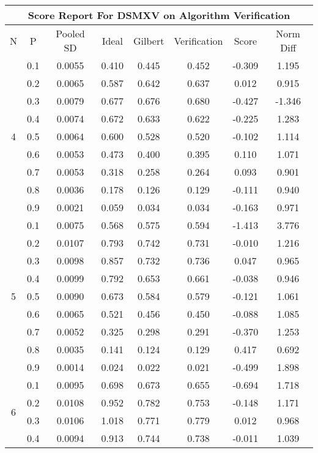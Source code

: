 \documentclass[11pt,a4paper]{report}
\begin{document}
\begin{longtable}{ | c | c || c | c | c | c | c | c | }
\hline
\multicolumn{8}{|c|}{ Score Report For DSMXV on Algorithm Verification} \\
\hline
N & P & Pooled SD &  Ideal &  Gilbert & Verification  & Score & Norm Diff \\
 \hline
 \hline
 \endhead
\multirow{9}{*}{4} & 0.1 & 0.0055 & 0.410 & 0.445 & 0.452 & -0.309 & 1.195 \\
 & 0.2 & 0.0065 & 0.587 & 0.642 & 0.637 & 0.012 & 0.915 \\
 & 0.3 & 0.0079 & 0.677 & 0.676 & 0.680 & -0.427 & -1.346 \\
 & 0.4 & 0.0074 & 0.672 & 0.633 & 0.622 & -0.225 & 1.283 \\
 & 0.5 & 0.0064 & 0.600 & 0.528 & 0.520 & -0.102 & 1.114 \\
 & 0.6 & 0.0053 & 0.473 & 0.400 & 0.395 & 0.110 & 1.071 \\
 & 0.7 & 0.0053 & 0.318 & 0.258 & 0.264 & 0.093 & 0.901 \\
 & 0.8 & 0.0036 & 0.178 & 0.126 & 0.129 & -0.111 & 0.940 \\
 & 0.9 & 0.0021 & 0.059 & 0.034 & 0.034 & -0.163 & 0.971 \\
 \hline
\multirow{9}{*}{5} & 0.1 & 0.0075 & 0.568 & 0.575 & 0.594 & -1.413 & 3.776 \\
 & 0.2 & 0.0107 & 0.793 & 0.742 & 0.731 & -0.010 & 1.216 \\
 & 0.3 & 0.0098 & 0.857 & 0.732 & 0.736 & 0.047 & 0.965 \\
 & 0.4 & 0.0099 & 0.792 & 0.653 & 0.661 & -0.038 & 0.946 \\
 & 0.5 & 0.0090 & 0.673 & 0.584 & 0.579 & -0.121 & 1.061 \\
 & 0.6 & 0.0065 & 0.521 & 0.456 & 0.450 & -0.088 & 1.085 \\
 & 0.7 & 0.0052 & 0.325 & 0.298 & 0.291 & -0.370 & 1.253 \\
 & 0.8 & 0.0035 & 0.141 & 0.124 & 0.129 & 0.417 & 0.692 \\
 & 0.9 & 0.0014 & 0.024 & 0.022 & 0.021 & -0.499 & 1.898 \\
 \hline
\multirow{9}{*}{6} & 0.1 & 0.0095 & 0.698 & 0.673 & 0.655 & -0.694 & 1.718 \\
 & 0.2 & 0.0108 & 0.952 & 0.782 & 0.753 & -0.148 & 1.171 \\
 & 0.3 & 0.0106 & 1.018 & 0.771 & 0.779 & 0.012 & 0.968 \\
 & 0.4 & 0.0094 & 0.913 & 0.744 & 0.738 & -0.011 & 1.039 \\

\end{longtable}
\end{document}
